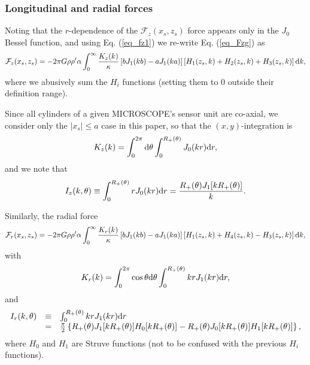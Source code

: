 \documentclass[12pt]{iopart}
\begin{document}
\subsubsection{Longitudinal and radial forces}

Noting that the $r$-dependence of the ${\mathcal F}_z(x_s,z_s)$ force appears only in the $J_0$ Bessel function, and using Eq. (\ref{eq_fz1}) we re-write Eq. (\ref{eq_Fzg}) as
\begin{equation}
{\mathcal F}_z(x_s, z_s) = -2\pi G \rho \rho' \alpha \int_0^\infty \frac{K_z(k)}{\kappa} \left[b J_1(kb) - a J_1(ka)\right] \left[H_1(z_s, k) + H_2(z_s, k) + H_3(z_s, k)\right] {\rm d}k,
\end{equation}
where we abusively sum the $H_i$ functions (setting them to 0 outside their definition range).

Since all cylinders of a given MICROSCOPE's sensor unit are co-axial, we consider only the $|x_s| \leqslant a$ case in this paper, so that the $(x,y)$-integration is 
\begin{equation} \label{eq_Kz}
K_z(k) = \int_0^{2\pi}{\rm d}\theta \int_0^{R_+(\theta)} J_0(kr) {\rm d}r,
\end{equation}
and we note that
\begin{equation}
I_z(k, \theta) \equiv \int_0^{R_+(\theta)} r J_0(kr) {\rm d}r = \frac{R_+(\theta) J_1[k R_+(\theta)]}{k}.
\end{equation}


Similarly, the radial force
\begin{equation}
{\mathcal F}_r(x_s, z_s) = -2\pi G \rho \rho' \alpha \int_0^\infty \frac{K_r(k)}{\kappa} \left[b J_1(kb) - a J_1(ka)\right] \left[H_1(z_s, k) + H_4(z_s, k) - H_3(z_s, k)\right] {\rm d}k,
\end{equation}
with 
\begin{equation} \label{eq_Kr}
K_r(k) = \int_0^{2\pi} \cos{\theta} {\rm d}\theta \int_0^{R_+(\theta)} kr J_1(kr) {\rm d}r,
\end{equation}
and
\begin{equation}
\begin{array}{lll}
I_r(k, \theta) & \equiv & \int_0^{R_+(\theta)} kr J_1(kr) {\rm d}r \\
 & = & \frac{\pi}{2} \left\{R_+(\theta) J_1[kR_+(\theta)] H_0[kR_+(\theta)] - R_+(\theta) J_0[kR_+(\theta)] H_1[kR_+(\theta)] \right\},
 \end{array}
\end{equation}
where $H_0$ and $H_1$ are Struve functions (not to be confused with the previous $H_i$ functions).
\end{document}
